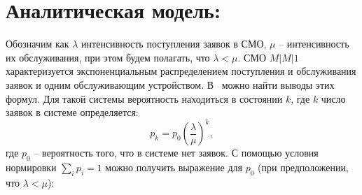 \documentclass[a4paper,12 pt]{article}
\begin{document}
\section*{Аналитическая модель:}
Обозначим как $\lambda $ интенсивность поступления заявок в СМО, $\mu$ -- интенсивность их обслуживания, при этом будем полагать, что $\lambda < \mu$. 
СМО $M|M|1$ характеризуется экспоненциальным распределением поступления и обслуживания заявок и одним обслуживающим устройством. В~\cite{kleinrock1975queuing} можно найти выводы этих формул. Для такой системы вероятность находиться в состоянии $k$, где $k$ число заявок в системе определяется:
\begin{equation}
p_k = p_0 (\frac{\lambda}{\mu})^k,
\end{equation}
где $p_0$ -- вероятность того, что в системе нет заявок. С помощью условия нормировки $\sum_i p_i = 1$ можно получить выражение для $p_0$ (при предположении, что $\lambda < \mu$):
\end{document}
